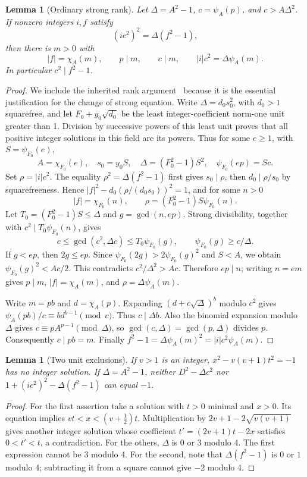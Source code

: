 \documentclass[11pt,a4paper]{article}
\newtheorem{lemma}[theorem]{Lemma}
\theoremstyle{remark}\newtheorem{remark}[theorem]{Remark}
\begin{document}
\begin{lemma}[Ordinary strong rank]\label{lem:ordinary}
Let $\Delta=A^2-1$, $c=\psi_A(p)$, and $c>A\Delta^2$.
If nonzero integers $i,f$ satisfy
\[
 (ic^2)^2=\Delta(f^2-1),
\]
then there is $m>0$ with
\[
 |f|=\chi_A(m),\qquad p\mid m,\qquad c\mid m,
 \qquad |i|c^2=\Delta\psi_A(m).
\]
In particular $c^2\mid f^2-1$.
\end{lemma}
\begin{proof}
We include the inherited rank argument~\cite{rank} because it is the
essential justification for the change of strong equation.
Write $\Delta=d_0s_0^2$, with $d_0>1$ squarefree, and let
$F_0+y_0\sqrt{d_0}$ be the least integer-coefficient norm-one unit
greater than 1. Division by successive powers of this least unit proves that
all positive integer solutions in this field are its powers. Thus for
some $e\ge1$, with $S=\psi_{F_0}(e)$,
\[
 A=\chi_{F_0}(e),\quad s_0=y_0S,\quad
 \Delta=(F_0^2-1)S^2,\quad\psi_{F_0}(ep)=Sc.
\]
Set $\rho=|i|c^2$. The equality $\rho^2=\Delta(f^2-1)$ first gives
$s_0\mid\rho$, then $d_0\mid\rho/s_0$ by squarefreeness. Hence
$|f|^2-d_0(\rho/(d_0s_0))^2=1$, and for some $n>0$
\[
 |f|=\chi_{F_0}(n),\qquad
 \rho=(F_0^2-1)S\psi_{F_0}(n).
\]
Let $T_0=(F_0^2-1)S\le\Delta$ and $g=\gcd(n,ep)$.
Strong divisibility, together with $c^2\mid T_0\psi_{F_0}(n)$, gives
\[
 c\le\gcd(c^2,\Delta c)
 \le T_0\psi_{F_0}(g),
 \qquad \psi_{F_0}(g)\ge c/\Delta.
\]
If $g<ep$, then $2g\le ep$. Since
$\psi_{F_0}(2g)>2\psi_{F_0}(g)^2$ and $S<A$, we obtain
$\psi_{F_0}(g)^2<Ac/2$. This contradicts
$c^2/\Delta^2>Ac$. Therefore $ep\mid n$; writing $n=em$
gives $p\mid m$, $|f|=\chi_A(m)$, and
$\rho=\Delta\psi_A(m)$.

Write $m=pb$ and $d=\chi_A(p)$. Expanding
$(d+c\sqrt\Delta)^b$ modulo $c^2$ gives
$\psi_A(pb)/c\equiv b d^{b-1}\pmod c$. Thus
$c\mid\Delta b$. Also the binomial expansion modulo $\Delta$
gives $c\equiv pA^{p-1}\pmod\Delta$, so
$\gcd(c,\Delta)=\gcd(p,\Delta)$ divides $p$.
Consequently $c\mid pb=m$. Finally
$f^2-1=\Delta\psi_A(m)^2=|i|c^2\psi_A(m)$.
\end{proof}

\begin{lemma}[Two unit exclusions]\label{lem:units}
If $v>1$ is an integer, $x^2-v(v+1)t^2=-1$ has no integer solution.
If $\Delta=A^2-1$, neither $D^2-\Delta c^2$ nor
$1+(ic^2)^2-\Delta(f^2-1)$ can equal $-1$.
\end{lemma}
\begin{proof}
For the first assertion take a solution with $t>0$ minimal and $x>0$.
Its equation implies $vt<x<(v+\tfrac12)t$. Multiplication by
$2v+1-2\sqrt{v(v+1)}$ gives another integer solution whose coefficient
$t'=(2v+1)t-2x$ satisfies $0<t'<t$, a contradiction.
For the others, $\Delta$ is $0$ or $3$ modulo 4. The first expression
cannot be $3$ modulo 4. For the second, note that
$\Delta(f^2-1)$ is $0$ or $1$ modulo 4; subtracting it from a square
cannot give $-2$ modulo 4.
\end{proof}
\end{document}

